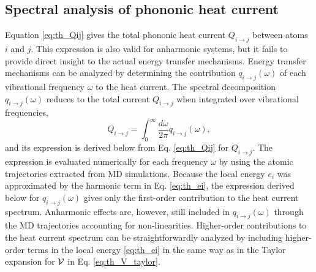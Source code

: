 \subsection{Spectral analysis of phononic heat current}
\label{sec:th_spectral_curr}
Equation \eqref{eq:th_Qij} gives the total phononic heat current $Q_{i\to j}$ between atoms $i$ and $j$. This expression is also valid for anharmonic systems, but it fails to provide direct insight to the actual energy transfer mechanisms. Energy transfer mechanisms can be analyzed by determining the contribution $q_{i\to j}(\omega)$ of each vibrational frequency $\omega$ to the heat current. The spectral decomposition $q_{i\to j}(\omega)$ reduces to the total current $Q_{i\to j}$ when integrated over vibrational frequencies,
\begin{equation}
 Q_{i\to j} = \int_0^{\infty} \frac{d\omega}{2\pi} q_{i\to j}(\omega), \label{eq:th_qij_def}
\end{equation}
and its expression is derived below from Eq. \eqref{eq:th_Qij} for $Q_{i\to j}$. The expression is evaluated numerically for each frequency $\omega$ by using the atomic trajectories extracted from MD simulations. Because the local energy $e_i$ was approximated by the harmonic term in Eq. \eqref{eq:th_ei}, the expression derived below for $q_{i\to j}(\omega)$ gives only the first-order contribution to the heat current spectrum. Anharmonic effects are, however, still included in $q_{i\to j}(\omega)$ through the MD trajectories accounting for non-linearities. Higher-order contributions to the heat current spectrum can be straightforwardly analyzed by including higher-order terms in the local energy \eqref{eq:th_ei} in the same way as in the Taylor expansion for $\mathcal{V}$ in Eq. \eqref{eq:th_V_taylor}. 



